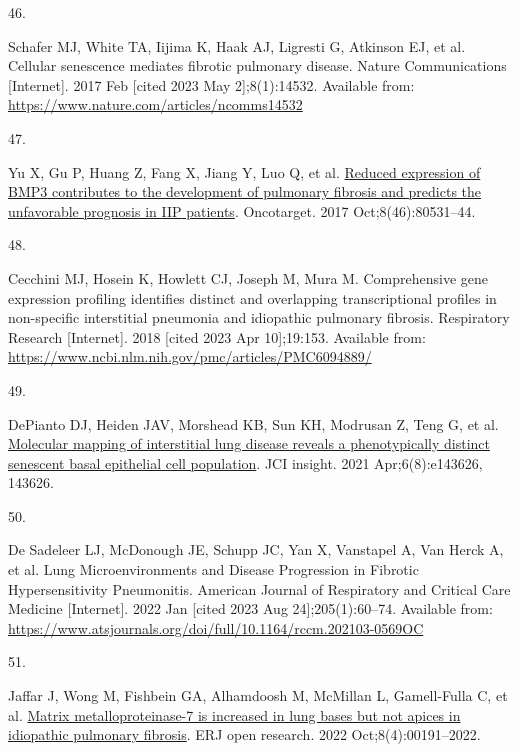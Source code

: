 \documentclass[
]{article}
\newlength{\cslhangindent}
\newlength{\csllabelwidth}
\newenvironment{CSLReferences}[2] %
 {\begin{list}{}{%
  \setlength{\itemindent}{0pt}
  \setlength{\leftmargin}{0pt}
  \setlength{\parsep}{0pt}
  \ifodd #1
   \setlength{\leftmargin}{\cslhangindent}
   \setlength{\itemindent}{-1\cslhangindent}
  \fi
  \setlength{\itemsep}{#2\baselineskip}}}
 {\end{list}}
\newcommand{\CSLLeftMargin}[1]{\parbox[t]{\csllabelwidth}{\strut#1\strut}}
\newcommand{\CSLRightInline}[1]{\parbox[t]{\linewidth - \csllabelwidth}{\strut#1\strut}}
\begin{document}
\begin{CSLReferences}{0}{1}
\CSLLeftMargin{46. }%
\CSLRightInline{Schafer MJ, White TA, Iijima K, Haak AJ, Ligresti G, Atkinson EJ, et al. Cellular senescence mediates fibrotic pulmonary disease. Nature Communications {[}Internet{]}. 2017 Feb {[}cited 2023 May 2{]};8(1):14532. Available from: \url{https://www.nature.com/articles/ncomms14532}}

\CSLLeftMargin{47. }%
\CSLRightInline{Yu X, Gu P, Huang Z, Fang X, Jiang Y, Luo Q, et al. \href{https://doi.org/10.18632/oncotarget.20083}{Reduced expression of {BMP3} contributes to the development of pulmonary fibrosis and predicts the unfavorable prognosis in {IIP} patients}. Oncotarget. 2017 Oct;8(46):80531--44. }

\CSLLeftMargin{48. }%
\CSLRightInline{Cecchini MJ, Hosein K, Howlett CJ, Joseph M, Mura M. Comprehensive gene expression profiling identifies distinct and overlapping transcriptional profiles in non-specific interstitial pneumonia and idiopathic pulmonary fibrosis. Respiratory Research {[}Internet{]}. 2018 {[}cited 2023 Apr 10{]};19:153. Available from: \url{https://www.ncbi.nlm.nih.gov/pmc/articles/PMC6094889/}}

\CSLLeftMargin{49. }%
\CSLRightInline{DePianto DJ, Heiden JAV, Morshead KB, Sun KH, Modrusan Z, Teng G, et al. \href{https://doi.org/10.1172/jci.insight.143626}{Molecular mapping of interstitial lung disease reveals a phenotypically distinct senescent basal epithelial cell population}. JCI insight. 2021 Apr;6(8):e143626, 143626. }

\CSLLeftMargin{50. }%
\CSLRightInline{De Sadeleer LJ, McDonough JE, Schupp JC, Yan X, Vanstapel A, Van Herck A, et al. Lung {Microenvironments} and {Disease} {Progression} in {Fibrotic} {Hypersensitivity} {Pneumonitis}. American Journal of Respiratory and Critical Care Medicine {[}Internet{]}. 2022 Jan {[}cited 2023 Aug 24{]};205(1):60--74. Available from: \url{https://www.atsjournals.org/doi/full/10.1164/rccm.202103-0569OC}}

\CSLLeftMargin{51. }%
\CSLRightInline{Jaffar J, Wong M, Fishbein GA, Alhamdoosh M, McMillan L, Gamell-Fulla C, et al. \href{https://doi.org/10.1183/23120541.00191-2022}{Matrix metalloproteinase-7 is increased in lung bases but not apices in idiopathic pulmonary fibrosis}. ERJ open research. 2022 Oct;8(4):00191--2022. }


\end{CSLReferences}
\end{document}
